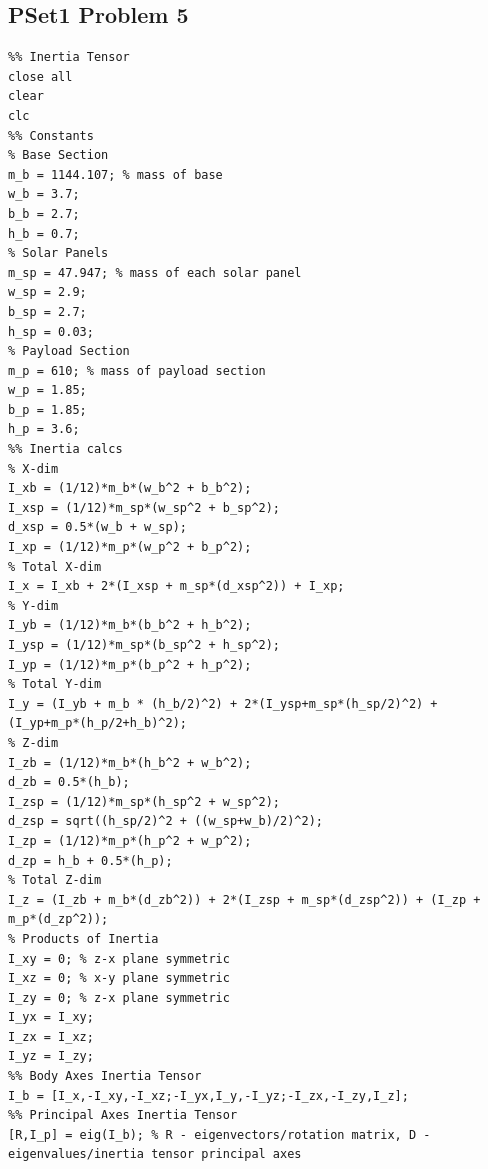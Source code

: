 \documentclass[12pt,a4paper,notitlepage]{article}
\begin{document}
\subsection{PSet1 Problem 5}\label{A:P1p5}
\begin{lstlisting}
%% Inertia Tensor
close all
clear
clc
%% Constants
% Base Section
m_b = 1144.107; % mass of base
w_b = 3.7;
b_b = 2.7;
h_b = 0.7;
% Solar Panels
m_sp = 47.947; % mass of each solar panel
w_sp = 2.9;
b_sp = 2.7;
h_sp = 0.03;
% Payload Section
m_p = 610; % mass of payload section
w_p = 1.85;
b_p = 1.85;
h_p = 3.6;
%% Inertia calcs
% X-dim
I_xb = (1/12)*m_b*(w_b^2 + b_b^2);
I_xsp = (1/12)*m_sp*(w_sp^2 + b_sp^2);
d_xsp = 0.5*(w_b + w_sp);
I_xp = (1/12)*m_p*(w_p^2 + b_p^2);
% Total X-dim
I_x = I_xb + 2*(I_xsp + m_sp*(d_xsp^2)) + I_xp;
% Y-dim
I_yb = (1/12)*m_b*(b_b^2 + h_b^2);
I_ysp = (1/12)*m_sp*(b_sp^2 + h_sp^2);
I_yp = (1/12)*m_p*(b_p^2 + h_p^2);
% Total Y-dim
I_y = (I_yb + m_b * (h_b/2)^2) + 2*(I_ysp+m_sp*(h_sp/2)^2) + (I_yp+m_p*(h_p/2+h_b)^2);
% Z-dim
I_zb = (1/12)*m_b*(h_b^2 + w_b^2);
d_zb = 0.5*(h_b);
I_zsp = (1/12)*m_sp*(h_sp^2 + w_sp^2);
d_zsp = sqrt((h_sp/2)^2 + ((w_sp+w_b)/2)^2);
I_zp = (1/12)*m_p*(h_p^2 + w_p^2);
d_zp = h_b + 0.5*(h_p);
% Total Z-dim
I_z = (I_zb + m_b*(d_zb^2)) + 2*(I_zsp + m_sp*(d_zsp^2)) + (I_zp + m_p*(d_zp^2));
% Products of Inertia
I_xy = 0; % z-x plane symmetric
I_xz = 0; % x-y plane symmetric
I_zy = 0; % z-x plane symmetric
I_yx = I_xy;
I_zx = I_xz;
I_yz = I_zy;
%% Body Axes Inertia Tensor
I_b = [I_x,-I_xy,-I_xz;-I_yx,I_y,-I_yz;-I_zx,-I_zy,I_z];
%% Principal Axes Inertia Tensor
[R,I_p] = eig(I_b); % R - eigenvectors/rotation matrix, D - eigenvalues/inertia tensor principal axes
\end{lstlisting}
\end{document}
